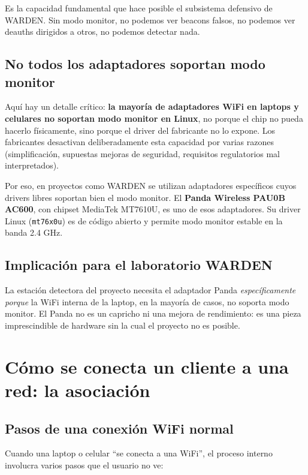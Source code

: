 \documentclass[11pt,a4paper]{article}
\begin{document}
Es la capacidad fundamental que hace posible el subsistema defensivo de
WARDEN. Sin modo monitor, no podemos ver beacons falsos, no podemos ver
deauths dirigidos a otros, no podemos detectar nada.

\subsection{No todos los adaptadores soportan modo monitor}
Aquí hay un detalle crítico: \textbf{la mayoría de adaptadores WiFi en
laptops y celulares no soportan modo monitor en Linux}, no porque el chip
no pueda hacerlo físicamente, sino porque el driver del fabricante no lo
expone. Los fabricantes desactivan deliberadamente esta capacidad por
varias razones (simplificación, supuestas mejoras de seguridad, requisitos
regulatorios mal interpretados).

Por eso, en proyectos como WARDEN se utilizan adaptadores específicos cuyos
drivers libres soportan bien el modo monitor. El \textbf{Panda Wireless
PAU0B AC600}, con chipset MediaTek MT7610U, es uno de esos adaptadores. Su
driver Linux (\texttt{mt76x0u}) es de código abierto y permite modo monitor
estable en la banda 2.4 GHz.

\subsection{Implicación para el laboratorio WARDEN}
La estación detectora del proyecto necesita el adaptador Panda
\emph{específicamente porque} la WiFi interna de la laptop, en la mayoría de
casos, no soporta modo monitor. El Panda no es un capricho ni una mejora de
rendimiento: es una pieza imprescindible de hardware sin la cual el
proyecto no es posible.

\section{Cómo se conecta un cliente a una red: la asociación}

\subsection{Pasos de una conexión WiFi normal}
Cuando una laptop o celular ``se conecta a una WiFi'', el proceso interno
involucra varios pasos que el usuario no ve:
\end{document}
